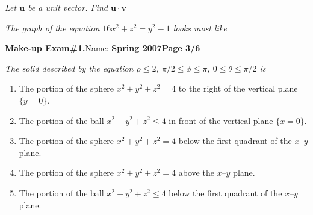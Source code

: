 \documentclass[12pt]{article}
\begin{document}
{\problem[10 pts] \em Let ${\boldsymbol u}$ be a unit vector.  Find
  ${\boldsymbol u} \cdot {\boldsymbol v}$}
\begin{center}
\end{center}

{\problem[10 pts] \em The graph of the equation $16x^2 + z^2 = y^2-1$
  looks most like}
\begin{center}
\end{center}
\newpage

\hfill{\bf Make-up Exam\#1.}\hfill Name: \makebox[4cm]{\hrulefill}\hfill{\bf Spring 2007}\hfill{\bf Page 3/6}

\bigskip
{\problem[10 pts] \em The solid described by the equation $\rho \leq
  2$, $\pi/2 \leq \phi \leq \pi$, $0\leq \theta \leq \pi/2$ is}
\begin{enumerate}
\item The portion of the sphere $x^2+y^2+z^2 = 4$ to the right of the vertical plane $\{ y=0\}$.
\item The portion of the ball $x^2+y^2+z^2 \leq 4$ in front of the vertical plane $\{ x=0\}$.
\item The portion of the sphere $x^2+y^2+z^2 = 4$ below the first
  quadrant of the $x$--$y$ plane.
\item The portion of the sphere $x^2+y^2+z^2 = 4$ above the $x$--$y$
  plane.
\item The portion of the ball $x^2+y^2+z^2 \leq 4$ below the first
  quadrant of the $x$--$y$ plane.
\end{enumerate}
\end{document}
